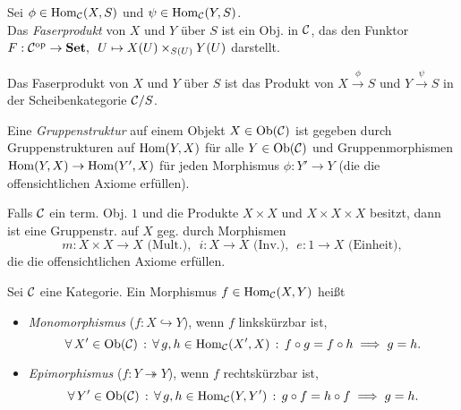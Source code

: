 \documentclass{cheat-sheet}
\begin{document}
\begin{defn}
  Sei $\phi \in \operatorname{Hom}_{\mathcal{C}}(X, S)$ und $\psi \in \operatorname{Hom}_{\mathcal{C}}(Y, S)$. \\
  Das \emph{Faserprodukt} von $X$ und $Y$ über $S$ ist ein Obj. in $\mathcal{C}$, das den Funktor
  $F : \mathcal{C}^{\mathrm{op}} \to \mathbf{Set}, \enspace U \mapsto X(U) \times_{S(U)} Y(U)$ darstellt.
\end{defn}

\begin{bem}
  Das Faserprodukt von $X$ und $Y$ über $S$ ist das Produkt von $X \xrightarrow{\phi} S$ und $Y \xrightarrow{\psi} S$ in der Scheibenkategorie $\mathcal{C}/S$.
\end{bem}


\begin{defn}
  Eine \emph{Gruppenstruktur} auf einem Objekt $X \in \operatorname{Ob}(\mathcal{C})$ ist gegeben durch Gruppenstrukturen auf $\operatorname{Hom}(Y, X)$ für alle $Y \in \operatorname{Ob}(\mathcal{C})$ und Gruppenmorphismen $\operatorname{Hom}(Y, X) \to \operatorname{Hom}(Y', X)$ für jeden Morphismus $\phi : Y' \to Y$ (die die offensichtlichen Axiome erfüllen).
\end{defn}

\begin{bem}
  Falls $\mathcal{C}$ ein term. Obj. $1$ und die Produkte $X \!\times\! X$ und $X \!\times\! X \!\times\! X$ besitzt, dann ist eine Gruppenstr. auf $X$ geg. durch Morphismen
  \[
    m : X \times X \to X \text{ (Mult.)}, \enspace
    i : X \to X \text{ (Inv.)}, \enspace
    e : 1 \to X \text{ (Einheit)},
  \]
  die die offensichtlichen Axiome erfüllen.
\end{bem}

\begin{defn}
  Sei $\mathcal{C}$ eine Kategorie. Ein Morphismus $f \in \operatorname{Hom}_{\mathcal{C}}(X, Y)$ heißt
  \begin{itemize}
    \item \emph{Monomorphismus} ($f : X \hookrightarrow Y$), wenn $f$ linkskürzbar ist, \dh{}
    \[
      \forall \, {X' \in \operatorname{Ob}(\mathcal{C})} \,:\, \forall \, {g, h \in \operatorname{Hom}_{\mathcal{C}}(X', X)} \,:\,
      f \circ g = f \circ h \implies g = h.
    \]
    \item \emph{Epimorphismus} ($f : Y \twoheadrightarrow Y$), wenn $f$ rechtskürzbar ist, \dh{}
    \[
      \forall \, {Y' \in \operatorname{Ob}(\mathcal{C})} \,:\, \forall \, {g, h \in \operatorname{Hom}_{\mathcal{C}}(Y, Y')} \,:\,
      g \circ f = h \circ f \implies g = h.
    \]
  \end{itemize}
\end{defn}
\end{document}
